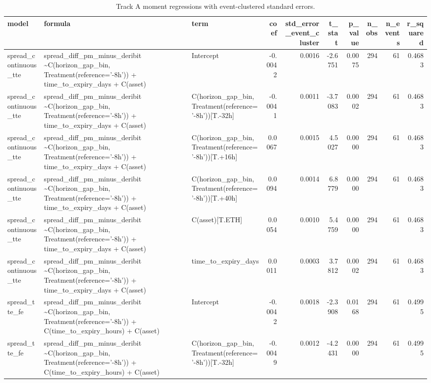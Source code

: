 \begin{table}
\caption{Track A moment regressions with event-clustered standard errors.}
\label{tab:trackA_spread_regressions}
\begin{tabular}{lllrrrrrrr}
\toprule
model & formula & term & coef & std\_error\_event\_cluster & t\_stat & p\_value & n\_obs & n\_events & r\_squared \\
\midrule
spread\_continuous\_tte & spread\_diff\_pm\_minus\_deribit \textasciitilde \space C(horizon\_gap\_bin, Treatment(reference='-8h')) + time\_to\_expiry\_days + C(asset) & Intercept & -0.0042 & 0.0016 & -2.6751 & 0.0075 & 294 & 61 & 0.4683 \\
spread\_continuous\_tte & spread\_diff\_pm\_minus\_deribit \textasciitilde \space C(horizon\_gap\_bin, Treatment(reference='-8h')) + time\_to\_expiry\_days + C(asset) & C(horizon\_gap\_bin, Treatment(reference='-8h'))[T.-32h] & -0.0041 & 0.0011 & -3.7083 & 0.0002 & 294 & 61 & 0.4683 \\
spread\_continuous\_tte & spread\_diff\_pm\_minus\_deribit \textasciitilde \space C(horizon\_gap\_bin, Treatment(reference='-8h')) + time\_to\_expiry\_days + C(asset) & C(horizon\_gap\_bin, Treatment(reference='-8h'))[T.+16h] & 0.0067 & 0.0015 & 4.5027 & 0.0000 & 294 & 61 & 0.4683 \\
spread\_continuous\_tte & spread\_diff\_pm\_minus\_deribit \textasciitilde \space C(horizon\_gap\_bin, Treatment(reference='-8h')) + time\_to\_expiry\_days + C(asset) & C(horizon\_gap\_bin, Treatment(reference='-8h'))[T.+40h] & 0.0094 & 0.0014 & 6.8779 & 0.0000 & 294 & 61 & 0.4683 \\
spread\_continuous\_tte & spread\_diff\_pm\_minus\_deribit \textasciitilde \space C(horizon\_gap\_bin, Treatment(reference='-8h')) + time\_to\_expiry\_days + C(asset) & C(asset)[T.ETH] & 0.0054 & 0.0010 & 5.4759 & 0.0000 & 294 & 61 & 0.4683 \\
spread\_continuous\_tte & spread\_diff\_pm\_minus\_deribit \textasciitilde \space C(horizon\_gap\_bin, Treatment(reference='-8h')) + time\_to\_expiry\_days + C(asset) & time\_to\_expiry\_days & 0.0011 & 0.0003 & 3.7812 & 0.0002 & 294 & 61 & 0.4683 \\
spread\_tte\_fe & spread\_diff\_pm\_minus\_deribit \textasciitilde \space C(horizon\_gap\_bin, Treatment(reference='-8h')) + C(time\_to\_expiry\_hours) + C(asset) & Intercept & -0.0042 & 0.0018 & -2.3908 & 0.0168 & 294 & 61 & 0.4995 \\
spread\_tte\_fe & spread\_diff\_pm\_minus\_deribit \textasciitilde \space C(horizon\_gap\_bin, Treatment(reference='-8h')) + C(time\_to\_expiry\_hours) + C(asset) & C(horizon\_gap\_bin, Treatment(reference='-8h'))[T.-32h] & -0.0049 & 0.0012 & -4.2431 & 0.0000 & 294 & 61 & 0.4995 \\

\end{tabular}
\end{table}

